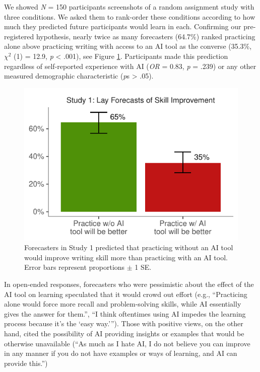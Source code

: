 \documentclass[11pt]{report}
\begin{document}
\begin{mainf}
We showed \textit{N} = 150 participants screenshots of a random assignment study with three conditions.
  We asked them to rank-order these conditions according to how much they predicted future participants would learn in each. 
  Confirming our pre-registered hypothesis, nearly twice as many forecasters (64.7\%) ranked practicing alone above practicing writing with access to an AI tool as the converse (35.3\%, $\chi^2$ (1) = 12.9, \textit{p} < .001), see Figure \ref{fig:s1}. 
  Participants made this prediction regardless of self-reported experience with AI (\textit{OR} = 0.83, \textit{p} = .239) or any other measured demographic characteristic (\textit{p}s > .05).
  
\begin{figure}[]
    \centering
    \includegraphics[width=1\linewidth]{ranking.pdf}
    \caption{Forecasters in Study 1 predicted that practicing without an AI tool would improve writing skill more than practicing with an AI tool. Error bars represent proportions $\pm$ 1 SE.}
    \label{fig:s1}
\end{figure}

In open-ended responses, forecasters who were pessimistic about the effect of the AI tool on learning speculated that it would crowd out effort (e.g., ``Practicing alone would force more recall and problem-solving skills, while AI essentially gives the answer for them.'', ``I think oftentimes using AI impedes the learning process because it's the `easy way.'''). Those with positive views, on the other hand, cited the possibility of AI providing insights or examples that would be otherwise unavailable (``As much as I hate AI, I do not believe you can improve in any manner if you do not have examples or ways of learning, and AI can provide this.'')




\end{mainf}
\end{document}
